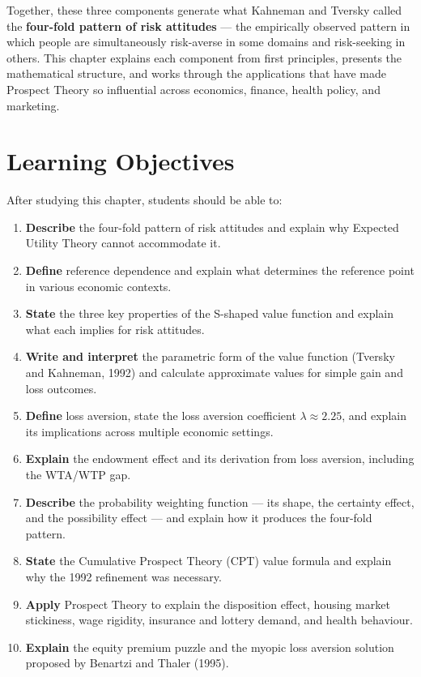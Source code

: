 \documentclass[12pt, letterpaper]{article}
\begin{document}
Together, these three components generate what Kahneman and Tversky called the \textbf{four-fold pattern of risk attitudes} --- the empirically observed pattern in which people are simultaneously risk-averse in some domains and risk-seeking in others. This chapter explains each component from first principles, presents the mathematical structure, and works through the applications that have made Prospect Theory so influential across economics, finance, health policy, and marketing.

\medskip


\section*{Learning Objectives}


After studying this chapter, students should be able to:

\begin{enumerate}
\item \textbf{Describe} the four-fold pattern of risk attitudes and explain why Expected Utility Theory cannot accommodate it.
\item \textbf{Define} reference dependence and explain what determines the reference point in various economic contexts.
\item \textbf{State} the three key properties of the S-shaped value function and explain what each implies for risk attitudes.
\item \textbf{Write and interpret} the parametric form of the value function (Tversky and Kahneman, 1992) and calculate approximate values for simple gain and loss outcomes.
\item \textbf{Define} loss aversion, state the loss aversion coefficient $\lambda \approx 2.25$, and explain its implications across multiple economic settings.
\item \textbf{Explain} the endowment effect and its derivation from loss aversion, including the WTA/WTP gap.
\item \textbf{Describe} the probability weighting function --- its shape, the certainty effect, and the possibility effect --- and explain how it produces the four-fold pattern.
\item \textbf{State} the Cumulative Prospect Theory (CPT) value formula and explain why the 1992 refinement was necessary.
\item \textbf{Apply} Prospect Theory to explain the disposition effect, housing market stickiness, wage rigidity, insurance and lottery demand, and health behaviour.
\item \textbf{Explain} the equity premium puzzle and the myopic loss aversion solution proposed by Benartzi and Thaler (1995).
\end{enumerate}
\end{document}
